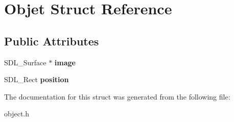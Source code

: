 \hypertarget{structObjet}{}\section{Objet Struct Reference}
\label{structObjet}
\subsection*{Public Attributes}
\begin{DoxyCompactItemize}
\item 
\mbox{\label{structObjet_adc26449d5051fc613b8972a08a3e7bba}} 
S\+D\+L\+\_\+\+Surface $\ast$ {\bfseries image}
\item 
\mbox{\label{structObjet_a92fd979dc6d37621933bf051914da800}} 
S\+D\+L\+\_\+\+Rect {\bfseries position}
\end{DoxyCompactItemize}


The documentation for this struct was generated from the following file\+:\begin{DoxyCompactItemize}
\item 
object.\+h\end{DoxyCompactItemize}
